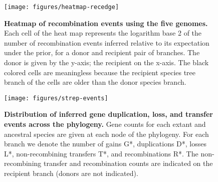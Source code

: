 \documentclass[10pt]{article}
\begin{document}
\begin{figure}
\texttt{[image: figures/heatmap-recedge]}
\caption{\label{fig:Heatmap-of-recombination}
{\bf Heatmap of recombination events using the five genomes.}
Each cell of the heat map represents the logarithm base
2 of the number of recombination events inferred relative to its expectation
under the prior, for a donor and recipient pair of branches. The donor is given by
the y-axis; the recipient on the x-axis.  The black colored cells are meaningless
because the recipient species tree branch of the cells are older than the donor
species branch.}
\end{figure}
\clearpage{}

\begin{figure}
\texttt{[image: figures/strep-events]}
\caption{\label{fig:Gene-duplication-loss} 
{\bf Distribution of inferred gene duplication, loss, and transfer events across
the phylogeny.}  Gene counts for
each extant and ancestral species are given at each node of the phylogeny.  For
each branch we denote the number of gains G*, duplications D*, losses L*,
non-recombining transfers T*, and recombinations R*.  The non-recombining
transfer and recombination counts are indicated on the recipient branch (donors
are not indicated).}
\end{figure}
\clearpage{}%
\end{document}
